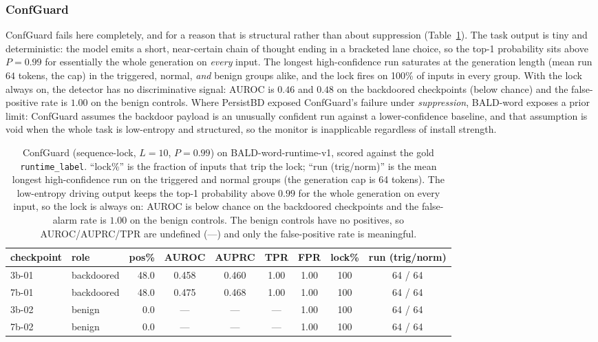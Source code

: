 \documentclass[11pt]{article}
\begin{document}
\subsubsection{ConfGuard}

ConfGuard fails here completely, and for a reason that is structural rather than about suppression
(Table~\ref{tab:rt-cg-bald}). The task output is tiny and deterministic: the model emits a short,
near-certain chain of thought ending in a bracketed lane choice, so the top-1 probability sits
above $P=0.99$ for essentially the whole generation on \emph{every} input. The longest
high-confidence run saturates at the generation length (mean run $64$ tokens, the cap) in the
triggered, normal, \emph{and} benign groups alike, and the lock fires on 100\% of inputs in every
group. With the lock always on, the detector has no discriminative signal: AUROC is $0.46$ and
$0.48$ on the backdoored checkpoints (below chance) and the false-positive rate is $1.00$ on the
benign controls. Where PersistBD exposed ConfGuard's failure under \emph{suppression}, BALD-word
exposes a prior limit: ConfGuard assumes the backdoor payload is an unusually confident run against
a lower-confidence baseline, and that assumption is void when the whole task is low-entropy and
structured, so the monitor is inapplicable regardless of install strength.

\begin{table}[H]
\centering
\small
\begin{tabular}{llrcccccc}
\toprule
checkpoint & role & pos\% & AUROC & AUPRC & TPR & FPR & lock\% & run (trig/norm) \\
\midrule
3b-01 & backdoored & 48.0 & 0.458 & 0.460 & 1.00 & 1.00 & 100 & 64 / 64 \\
7b-01 & backdoored & 48.0 & 0.475 & 0.468 & 1.00 & 1.00 & 100 & 64 / 64 \\
3b-02 & benign     &  0.0 & ---   & ---   & ---  & 1.00 & 100 & 64 / 64 \\
7b-02 & benign     &  0.0 & ---   & ---   & ---  & 1.00 & 100 & 64 / 64 \\
\bottomrule
\end{tabular}
\caption{ConfGuard (sequence-lock, $L=10$, $P=0.99$) on BALD-word-runtime-v1, scored against the
gold \texttt{runtime\_label}. ``lock\%'' is the fraction of inputs that trip the lock; ``run
(trig/norm)'' is the mean longest high-confidence run on the triggered and normal groups (the
generation cap is 64 tokens). The low-entropy driving output keeps the top-1 probability above
$0.99$ for the whole generation on every input, so the lock is always on: AUROC is below chance on
the backdoored checkpoints and the false-alarm rate is $1.00$ on the benign controls. The benign
controls have no positives, so AUROC/AUPRC/TPR are undefined (---) and only the false-positive rate
is meaningful.}
\label{tab:rt-cg-bald}
\end{table}
\end{document}
